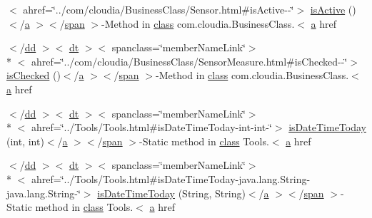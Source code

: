 \begin{DoxyCompactItemize}
$<$ ahref=\char`\"{}../com/cloudia/Business\-Class/Sensor.\-html\#is\-Active-\/-\/\char`\"{}$>$ \hyperlink{index-9_8html_a3682bd979e70c1efa4ab433f6bd7018c}{is\-Active} ()$<$/\hyperlink{style_8css_a5e8981582017bb8b84c21f148345d1f7}{a} $>$$<$/\hyperlink{stylesheet_8css_a8343996ebcf16220b04e54659aac31cc}{span} $>$-\/Method in \hyperlink{_tools_8html_acf06f836132665ba8114f5a414c2403f}{class} com.\-cloudia.\-Business\-Class.$<$ \hyperlink{style_8css_a5e8981582017bb8b84c21f148345d1f7}{a} href
\item 
$<$/\hyperlink{stylesheet_8css_a47f4718a86835a7771ec592ece845221}{dd} $>$$<$ \hyperlink{stylesheet_8css_a107565fb4039d33b041380d6e0ea1d80}{dt} $>$$<$ spanclass=\char`\"{}member\-Name\-Link\char`\"{}$>$\\*
$<$ ahref=\char`\"{}../com/cloudia/Business\-Class/Sensor\-Measure.\-html\#is\-Checked-\/-\/\char`\"{}$>$ \hyperlink{index-9_8html_a98b69c2a6172d80581ed94c37ae76b71}{is\-Checked} ()$<$/\hyperlink{style_8css_a5e8981582017bb8b84c21f148345d1f7}{a} $>$$<$/\hyperlink{stylesheet_8css_a8343996ebcf16220b04e54659aac31cc}{span} $>$-\/Method in \hyperlink{_tools_8html_acf06f836132665ba8114f5a414c2403f}{class} com.\-cloudia.\-Business\-Class.$<$ \hyperlink{style_8css_a5e8981582017bb8b84c21f148345d1f7}{a} href
\item 
$<$/\hyperlink{stylesheet_8css_a47f4718a86835a7771ec592ece845221}{dd} $>$$<$ \hyperlink{stylesheet_8css_a107565fb4039d33b041380d6e0ea1d80}{dt} $>$$<$ spanclass=\char`\"{}member\-Name\-Link\char`\"{}$>$\\*
$<$ ahref=\char`\"{}../Tools/Tools.\-html\#is\-Date\-Time\-Today-\/int-\/int-\/\char`\"{}$>$ \hyperlink{index-9_8html_a89bd24249b7864a7dbf08099ee8f79f1}{is\-Date\-Time\-Today} (int, int)$<$/\hyperlink{style_8css_a5e8981582017bb8b84c21f148345d1f7}{a} $>$$<$/\hyperlink{stylesheet_8css_a8343996ebcf16220b04e54659aac31cc}{span} $>$-\/Static method in \hyperlink{_tools_8html_acf06f836132665ba8114f5a414c2403f}{class} Tools.$<$ \hyperlink{style_8css_a5e8981582017bb8b84c21f148345d1f7}{a} href
\item 
$<$/\hyperlink{stylesheet_8css_a47f4718a86835a7771ec592ece845221}{dd} $>$$<$ \hyperlink{stylesheet_8css_a107565fb4039d33b041380d6e0ea1d80}{dt} $>$$<$ spanclass=\char`\"{}member\-Name\-Link\char`\"{}$>$\\*
$<$ ahref=\char`\"{}../Tools/Tools.\-html\#is\-Date\-Time\-Today-\/java.\-lang.\-String-\/java.\-lang.\-String-\/\char`\"{}$>$ \hyperlink{index-9_8html_a900e137ff91ae721a7d3d733ada19072}{is\-Date\-Time\-Today} (String, String)$<$/\hyperlink{style_8css_a5e8981582017bb8b84c21f148345d1f7}{a} $>$$<$/\hyperlink{stylesheet_8css_a8343996ebcf16220b04e54659aac31cc}{span} $>$-\/Static method in \hyperlink{_tools_8html_acf06f836132665ba8114f5a414c2403f}{class} Tools.$<$ \hyperlink{style_8css_a5e8981582017bb8b84c21f148345d1f7}{a} href
\end{DoxyCompactItemize}
